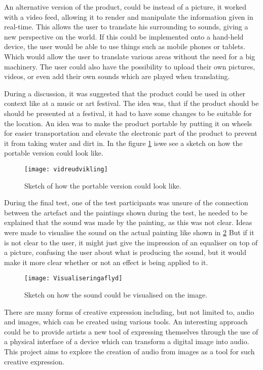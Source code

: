 An alternative version of the product, could be instead of a picture, it worked with a video feed, allowing it to render and manipulate the information given in real-time. This allows the user to translate his surrounding to sounds, giving a new perspective on the world. If this could be implemented onto a hand-held device, the user would be able to use things such as mobile phones or tablets. Which would allow the user to translate various areas without the need for a big machinery.
The user could also have the possibility to upload their own pictures, videos, or even add their own sounds which are played when translating.

During a discussion, it was suggested that the product could be used in other context like at a music or art festival. The idea was, that if the product should be should be presented at a festival, it had to have some changes to be suitable for the location. An idea was to make the product portable by putting it on wheels for easier transportation and elevate the electronic part of the product to prevent it from taking water and dirt in. In the figure \ref{fig:vidreudvikling} iswe see a sketch on how the portable version could look like.

\begin{figure}[!h]
\centering
\texttt{[image: vidreudvikling]}
\caption{\label{fig:vidreudvikling} Sketch of how the portable version could look like.}
\end{figure}

During the final test, one of the test participants was unsure of the connection between the artefact and the paintings shown during the test, he needed to be explained that the sound was made by the painting, as this was not clear. Ideas were made to visualise the sound on the actual painting like shown in \ref{fig:Visualiseringaflyd}  But if it is not clear to the user, it might just give the impression of an equaliser on top of a picture, confusing the user about what is producing the sound, but it would make it more clear whether or not an effect is being applied to it. 

\begin{figure}[!h]
\centering
\texttt{[image: Visualiseringaflyd]}
\caption{\label{fig:Visualiseringaflyd} Sketch on how the sound could be visualised on the image.}
\end{figure}





There are many forms of creative expression including, but not limited to, audio and images, which can be created using various tools. An interesting approach could be to provide artists a new tool of expressing themselves through the use of a physical interface of a device which can transform a digital image into audio. This project aims to explore the creation of audio from images as a tool for such creative expression.



